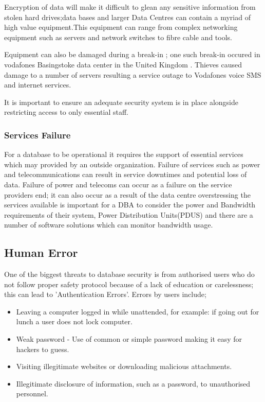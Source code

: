 \documentclass[11pt, twocolumn]{article}
\begin{document}
Encryption of data will make it  difficult to glean any sensitive information from stolen hard drives;data bases and larger Data Centres can contain a myriad of high value equipment.This equipment can range from complex networking equipment such as servers and network switches to fibre cable and tools.

Equipment can also be damaged during a break-in ; one such break-in occured in vodafones Basingstoke data center in the United Kingdom \cite{sean8}.  Thieves caused damage to a number of servers resulting a service outage to Vodafones voice SMS and internet services.

It is important to ensure an adequate security system is in place alongside restricting access to only essential staff.


\subsubsection{Services Failure}
For a database to be operational it requires the support of essential services which may provided by an outside organization.  Failure of services such as power and telecommunications can result in service downtimes and potential loss of data.  Failure of power and telecoms can occur as a failure on the service providers end; it can also occur as a result of the data centre overstressing the services available is important for a DBA to consider the power and Bandwidth requirements of their system, Power Distribution Units(PDUS) and there are a number of software solutions which can monitor bandwidth usage.


\subsection{Human Error}
One of the biggest threats to database security is from authorised users who do not follow proper safety protocol because of a lack of education or carelessness; this can lead to 'Authentication Errors'.  Errors by users include;

\begin{itemize}
\item Leaving a computer logged in while unattended, for example: if going out for lunch a user does not lock computer.
\item Weak password - Use of common or simple password making it easy for hackers to guess.
\item Visiting illegitimate websites or downloading malicious attachments.
\item Illegitimate disclosure of information, such as a password, to unauthorised personnel.
\end{itemize}
\end{document}

